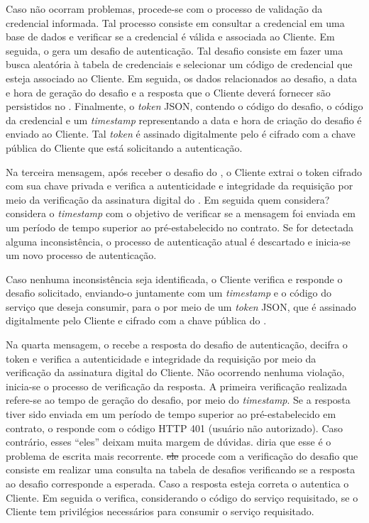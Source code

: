 Caso não ocorram problemas, procede-se com o processo de validação da credencial informada. Tal processo consiste em 
consultar a credencial em uma base de dados e verificar se a credencial \'{e} válida e associada ao Cliente. Em seguida, o \servidorAA{} 
gera um desafio de autenticação. Tal desafio consiste em fazer uma busca aleatória à tabela de credenciais e selecionar um código de 
credencial que esteja associado ao Cliente. Em seguida, os dados relacionados ao desafio, a data e hora de geração do desafio e a resposta que o Cliente deverá 
fornecer s\~{a}o persistidos no \servidorBD. Finalmente, o \emph{token} JSON, contendo o código do desafio, o código da credencial e um \emph{timestamp} representando a data e hora de criação do desafio é enviado ao Cliente. Tal \emph{token} \'{e} assinado digitalmente pelo \servidorAA{} \'{e} cifrado com a chave pública do 
Cliente que está solicitando a autenticação.

Na terceira mensagem, após receber o desafio do \servidorAA, o Cliente extrai o token cifrado com sua chave 
privada e verifica a autenticidade e integridade da requisição por meio da verificação da assinatura digital do \servidorAA. 
Em seguida {\color{red}quem considera?} considera o \emph{timestamp} com o objetivo de verificar se a mensagem foi 
enviada em um período de tempo superior ao pré-estabelecido no contrato. Se for detectada alguma inconsist\^{e}ncia, 
o processo de autenticação atual é descartado e inicia-se um novo processo de autenticação.

Caso nenhuma inconsist\^{e}ncia seja identificada, o Cliente verifica e responde o desafio solicitado, enviando-o 
juntamente com um \emph{timestamp} e o código do serviço que deseja consumir, para o \servidorAA{} 
por meio de um \emph{token} JSON, que é assinado digitalmente pelo Cliente e cifrado com a chave pública do \servidorAA.

Na quarta mensagem, o \servidorAA{} recebe a resposta do desafio de autenticação, decifra o token e verifica a autenticidade e integridade 
da requisição por meio da verificação da assinatura digital do Cliente.  Não ocorrendo nenhuma viola\c c\~{a}o, inicia-se o processo de 
verificação da resposta. A primeira verificação realizada refere-se ao tempo de geração do desafio, por meio do \emph{timestamp}. Se a resposta 
tiver sido enviada em um período de tempo superior ao pré-estabelecido em contrato, o \servidorAA{} responde com o 
c\'{o}digo HTTP 401 (usuário não autorizado). Caso contrário, {\color{red}esses ``eles'' deixam muita margem de d\'{u}vidas. diria que esse \'{e} o 
problema de escrita mais recorrente.} \sout{ele} procede com a verificação do desafio que consiste em realizar uma consulta na tabela de desafios 
verificando se a resposta ao desafio corresponde a esperada. Caso a resposta esteja correta o \servidorAA{} 
autentica o Cliente. Em seguida o \servidorAA{} verifica, considerando o código do serviço requisitado, 
se o Cliente tem privilégios necessários para consumir o serviço requisitado.

